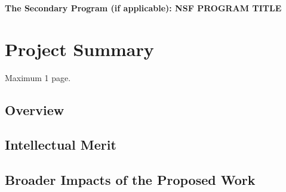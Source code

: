 \centerline{
{\color{blue} \textbf {The Secondary Program (if applicable): NSF PROGRAM TITLE}}
}

\section{Project Summary}
{\color{red} Maximum 1 page.}

\subsection{Overview}
\lipsum[66]

\subsection{Intellectual Merit}
\lipsum[66]


\subsection{Broader Impacts of the Proposed Work}
\lipsum[66]
